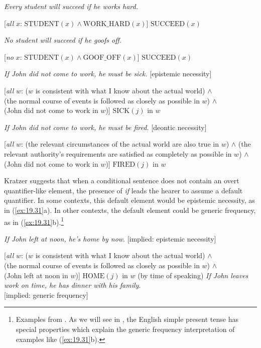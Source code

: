 \ea \label{ex:19.29}
\ea   \textit{Every student will succeed if he works hard.}\\
\smallskip
  
{}[\textit{all} $x$: $\text{STUDENT}(x) \wedge \text{WORK\_HARD}(x)$] $\text{SUCCEED}(x)$

\ex  \textit{No student will succeed if he goofs off.}\\
\smallskip
  
{}[\textit{no} $x$: $\text{STUDENT}(x) \wedge \text{GOOF\_OFF}(x)$] $\text{SUCCEED}(x)$
\z \z

\ea \label{ex:19.30}
\ea  \textit{ If John did not come to work, he must be sick.}  [epistemic necessity]\\
  \smallskip

  {}[\textit{all} $w$: ($w$ is consistent with what I know about the actual world) $\wedge$\\
  (the normal course of events is followed as closely as possible in $w$) $\wedge$\\
  (John did not come to work in $w$)] $\text{SICK}(j)$ in $w$
  
\ex  \textit{If John did not come to work, he must be fired.}  [deontic necessity]\\
  \smallskip
  
  {}[\textit{all} $w$: (the relevant circumstances of the actual world are also true in $w$) $\wedge$
  (the relevant authority’s requirements are satisfied as completely as possible in $w$) $\wedge$
  (John did not come to work in $w$)] $\text{FIRED}(j)$ in $w$
\z \z


Kratzer suggests that when a conditional sentence does not contain an overt quantifier-like element, the presence of \textit{if} leads the hearer to assume a default quantifier. In some contexts, this default element would be epistemic necessity, as in (\ref{ex:19.31}a). In other contexts, the default element could be generic frequency, as in (\ref{ex:19.31}b).\footnote{Examples from . As we will see in , the English simple present tense has special properties which explain the generic frequency interpretation of examples like (\ref{ex:19.31}b).}


\ea \label{ex:19.31}
\ea   \textit{If John left at noon, he’s home by now}.
\hfill  [implied: epistemic necessity]\\
  \smallskip
  
  {}[\textit{all} $w$: ($w$ is consistent with what I know about the actual world) $\wedge$\\
  (the normal course of events is followed as closely as possible in $w$) $\wedge$\\
  (John left at noon in $w$)] $\text{HOME}(j)$ in $w$ (by time of speaking) 
\ex  \textit{If John leaves work on time, he has dinner with his family}.\\
\hfill [implied: generic frequency]\\
  
